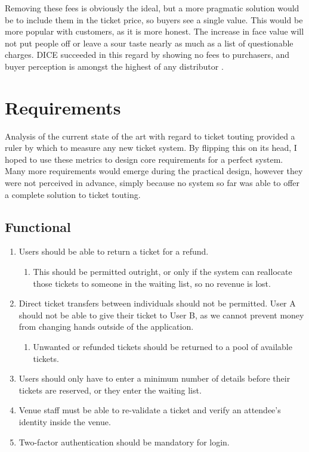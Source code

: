 \documentclass[12pt,a4paper]{bhamdissertation}
\begin{document}
Removing these fees is obviously the ideal, but a more pragmatic solution would be to include them in the ticket price, so buyers see a single value. This would be more popular with customers, as it is more honest. The increase in face value will not put people off or leave a sour taste nearly as much as a list of questionable charges. DICE succeeded in this regard by showing no fees to purchasers, and buyer perception is amongst the highest of any distributor \cite{D16}.

\chapter{Requirements} \label{requirements}

Analysis of the current state of the art with regard to ticket touting provided a ruler by which to measure any new ticket system. By flipping this on its head, I hoped to use these metrics to design core requirements for a perfect system. Many more requirements would emerge during the practical design, however they were not perceived in advance, simply because no system so far was able to offer a complete solution to ticket touting.

\section{Functional}

\begin{enumerate}
    \item Users should be able to return a ticket for a refund.
    \begin{enumerate}
        \item This should be permitted outright, or only if the system can reallocate those tickets to someone in the waiting list, so no revenue is lost.
    \end{enumerate}
    \item Direct ticket transfers between individuals should not be permitted. User A should not be able to give their ticket to User B, as we cannot prevent money from changing hands outside of the application.
    \begin{enumerate}
        \item Unwanted or refunded tickets should be returned to a pool of available tickets.
    \end{enumerate}
    \item Users should only have to enter a minimum number of details before their tickets are reserved, or they enter the waiting list.
    \item Venue staff must be able to re-validate a ticket and verify an attendee's identity inside the venue.
    \item Two-factor authentication should be mandatory for login.
\end{enumerate}
\end{document}
